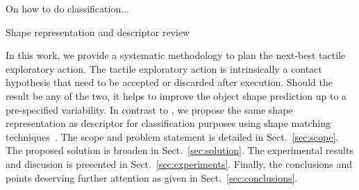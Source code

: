

On how to do classification...

Shape representation and descriptor review \citet{Zhang2004Review}

In this work, we provide a systematic methodology to plan the next-best tactile exploratory action. The tactile exploratory action is intrinsically a contact hypothesis that need to be accepted or discarded after execution. Should the result be any of the two, it helps to improve the object shape prediction up to a pre-specified variability. In contrast to \citet{Bjorkman2013Enhancing}, we propose the same shape representation as descriptor for classification purposes using shape matching techniques~\citep{Belongie2002Shape}. The scope and problem statement is detailed in Sect.~\ref{sec:scope}. The proposed solution is broaden in Sect.~\ref{sec:solution}. The experimental results and discusion is presented in Sect.~\ref{sec:experiments}. Finally, the conclusions and points deserving further attention as given in Sect.~\ref{sec:conclusions}.
